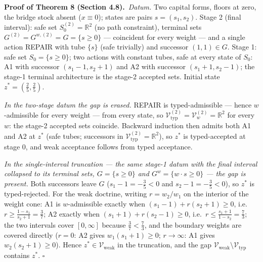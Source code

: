 \documentclass[3p,11pt]{elsarticle}
\begin{document}
\textbf{Proof of Theorem 8 (Section 4.8).}\ \emph{Datum.} Two capital forms, floors at zero, the bridge stock absent
(\(x \equiv 0\)); states are pairs \(s = (s_1, s_2)\). Stage 2 (final
interval): safe set \(S_0^{(2)} = \mathbb{R}^2\) (no path constraint),
terminal sets \(G^{(2)} = G^{w,(2)} = G = \{ s \ge 0 \}\) --- coincident
for every weight --- and a single action REPAIR with tube \(\{s\}\)
(safe trivially) and successor \((1, 1) \in G\). Stage 1: safe set
\(S_0 = \{ s \ge 0 \}\); two actions with constant tubes, safe at every
state of \(S_0\): A1 with successor \((s_1 - 1, s_2 + 1)\) and A2 with
successor \((s_1 + 1, s_2 - 1)\); the stage-1 terminal architecture is
the stage-2 accepted sets. Initial state \(z^* = (\tfrac25, \tfrac25)\).

\emph{In the two-stage datum the gap is erased.} REPAIR is
typed-admissible --- hence \(w\)-admissible for every weight --- from
every state, so
\(\mathcal{V}_{\mathrm{typ}}^{(2)} = \mathcal{V}_w^{(2)} = \mathbb{R}^2\)
for every \(w\): the stage-2 accepted sets coincide. Backward induction
then admits both A1 and A2 at \(z^*\) (safe tubes; successors in
\(\mathcal{V}_{\mathrm{typ}}^{(2)} = \mathbb{R}^2\)), so \(z^*\) is
typed-accepted at stage 0, and weak acceptance follows from typed
acceptance.

\emph{In the single-interval truncation --- the same stage-1 datum with
the final interval collapsed to its terminal sets, \(G = \{s \ge 0\}\)
and \(G^w = \{w \cdot s \ge 0\}\) --- the gap is present.} Both
successors leave \(G\) (\(s_1 - 1 = -\tfrac35 < 0\) and
\(s_2 - 1 = -\tfrac35 < 0\)), so \(z^*\) is typed-rejected. For the weak
doctrine, writing \(r = w_2 / w_1\) on the interior of the weight cone:
A1 is \(w\)-admissible exactly when \((s_1 - 1) + r (s_2 + 1) \ge 0\),
i.e.~\(r \ge \tfrac{1 - s_1}{s_2 + 1} = \tfrac37\); A2 exactly when
\((s_1 + 1) + r (s_2 - 1) \ge 0\),
i.e.~\(r \le \tfrac{s_1 + 1}{1 - s_2} = \tfrac73\); the two intervals
cover \([0, \infty]\) because \(\tfrac37 < \tfrac73\), and the boundary
weights are covered directly (\(r = 0\): A2 gives
\(w_1(s_1 + 1) \ge 0\); \(r \to \infty\): A1 gives
\(w_2(s_2 + 1) \ge 0\)). Hence \(z^* \in \mathcal{V}_{\mathrm{weak}}\)
in the truncation, and the gap
\(\mathcal{V}_{\mathrm{weak}} \setminus \mathcal{V}_{\mathrm{typ}}\)
contains \(z^*\). \ensuremath{\square}
\end{document}
